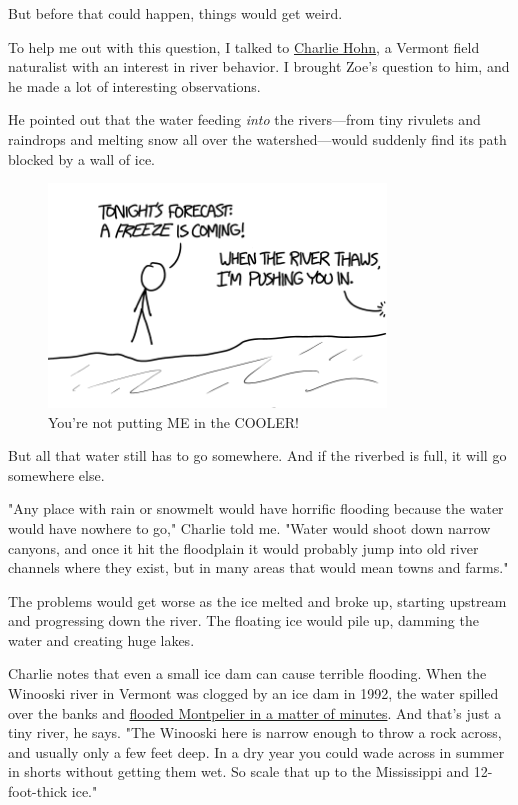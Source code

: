 {{But before that could happen, things would get weird.}

{To help me out with this question, I talked to \href{http://coyot.es/slowwatermovement}{Charlie Hohn}, a Vermont field naturalist with an interest in river behavior. I brought Zoe's question to him, and he made a lot of interesting observations.}

{He pointed out that the water feeding \emph{into} the rivers—from tiny rivulets and raindrops and melting snow all over the watershed—would suddenly find its path blocked by a wall of ice.}

\begin{figure}[!htbp]
\centering
\includegraphics[scale=0.5, max width=0.8\textwidth]{imgs/a/121/forecast.png}
\caption{You're not putting ME in the COOLER!}
\end{figure}

{But all that water still has to go somewhere. And if the riverbed is full, it will go somewhere else.}

{"Any place with rain or snowmelt would have horrific flooding because the water would have nowhere to go," Charlie told me. "Water would shoot down narrow canyons, and once it hit the floodplain it would probably jump into old river channels where they exist, but in many areas that would mean towns and farms."}

{The problems would get worse as the ice melted and broke up, starting upstream and progressing down the river. The floating ice would pile up, damming the water and creating huge lakes.}

{Charlie notes that even a small ice dam can cause terrible flooding. When the Winooski river in Vermont was clogged by an ice dam in 1992, the water spilled over the banks and \href{http://www.montpelier-vt.org/community/351/Flood-of-1992.html}{flooded Montpelier in a matter of minutes}. And that's just a tiny river, he says. "The Winooski here is narrow enough to throw a rock across, and usually only a few feet deep. In a dry year you could wade across in summer in shorts without getting them wet. So scale that up to the Mississippi and 12-foot-thick ice."}

}
